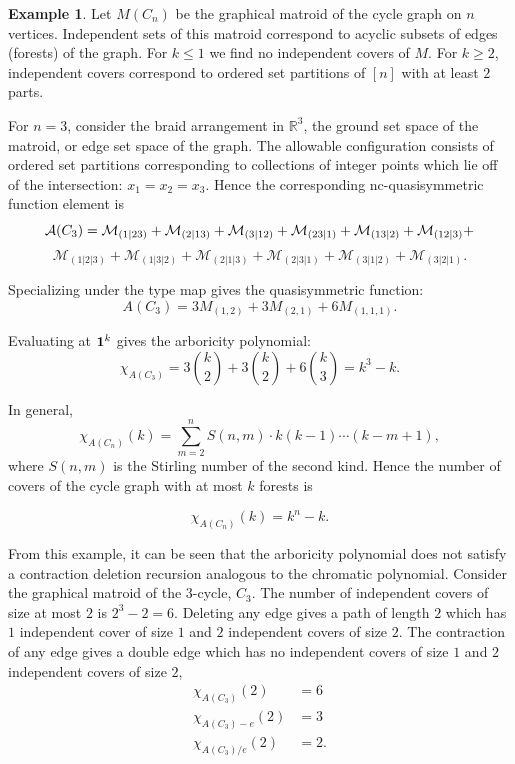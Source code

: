 \documentclass[12pt,reqno]{amsart}
\numberwithin{definition}{section}
\theoremstyle{definition}
\newtheorem{example}[definition]{Example}
\newcommand{\ncM}{\mathcal{M}}
\begin{document}
\begin{example}

Let $M(C_n)$ be the graphical matroid of the cycle graph on $n$
vertices.  Independent sets of this matroid correspond to acyclic
subsets of edges (forests) of the graph.  For $k \leq 1$ we find no
independent covers of $M$.  For $k \geq 2$, independent covers
correspond to ordered set partitions of $[n]$ with at least $2$ parts.


For $n=3$,  consider the braid arrangement in $\mathbb{R}^3$, the ground set space of the
matroid, or edge set space of the graph.  The allowable configuration consists of ordered set partitions
corresponding to collections of integer points which lie off of the
intersection: $x_1 = x_2 = x_3$. Hence the corresponding nc-quasisymmetric function element is 
$${\bf{{\mathcal A}}}(C_3) = \ncM_{(1|23)} + \ncM_{(2|13)} + \ncM_{(3|12)} + \ncM_{(23|1)} + \ncM_{(13|2)} +  \ncM_{(12|3)} + $$ $$ \ncM_{(1|2|3)} + \ncM_{(1|3|2)}
+ \ncM_{(2|1|3)} + \ncM_{(2|3|1)} + \ncM_{(3|1|2)} + \ncM_{(3|2|1)}. $$

\noindent Specializing under the type map gives the quasisymmetric function:
$${ A}(C_3) = 3 M_{(1,2)} + 3 M_{(2,1)} + 6 M_{(1,1,1)}. $$

\noindent Evaluating at ${\bf 1}^k $ gives the arboricity polynomial:
$$ \chi_{A(C_3)} = 3 { k \choose 2} + 3 { k \choose 2} + 6 { k \choose 3} = k^3 - k. $$

In general,
$$\chi_{A(C_n)}(k) = \sum_{m=2}^{n} S(n,m) \cdot k(k-1) \cdots (k-m+1), $$
where $S(n,m)$ is the Stirling number of the second kind. 
Hence the number of covers of the cycle graph with at most $k$ forests is

$$\chi_{A(C_n)}(k) = k^n - k. $$

\end{example}

From this example, it can be seen that the arboricity polynomial does
not satisfy a contraction deletion recursion analogous to the chromatic polynomial.  Consider the graphical matroid of the $3$-cycle, $C_3$.  The number of independent covers of size at most $2$ is $2^3-2 = 6$.    Deleting any edge gives a path of length $2$ which has $1$ independent cover of size $1$ and $2$ independent covers of size $2$.  The contraction of any edge gives a double edge which has no independent covers of size $1$ and $2$ independent covers of size $2$,  
\begin{align*}
\chi_{A(C_3)}(2) &= 6 \\
\chi_{A(C_3)-e}(2) &= 3 \\
\chi_{A(C_3) / e }(2)  &= 2.
\end{align*}
\end{document}
